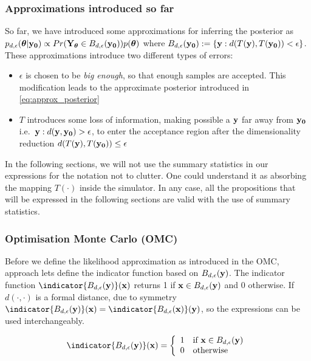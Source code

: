 \subsubsection{Approximations introduced so far}

So far, we have introduced some approximations for inferring the
posterior as
$p_{d,\epsilon}(\boldsymbol{\theta}|\mathbf{y_0}) \propto Pr(\mathbf{Y}_{\boldsymbol{\theta}} \in
B_{d,\epsilon}(\mathbf{y_0}))p(\boldsymbol{\theta})$ where
$B_{d,\epsilon}(\mathbf{y_0}) := \{\mathbf{y}: d(T(\mathbf{y}), T(\mathbf{y_0})) < \epsilon \}$. These
approximations introduce two different types of errors:

\begin{itemize}
\item $\epsilon$ is chosen to be \textit{big enough}, so that enough
  samples are accepted. This modification leads to the approximate
  posterior introduced in \eqref{eq:approx_posterior}
\item $T$ introduces some loss of information, making possible a $\mathbf{y}$
  far away from $\mathbf{y_0}$ i.e.\ $\mathbf{y}: d(\mathbf{y},\mathbf{y_0})>\epsilon$, to enter
  the acceptance region after the dimensionality reduction
  $d(T(\mathbf{y}), T(\mathbf{y_0})) \leq \epsilon$
\end{itemize}

\noindent
In the following sections, we will not use the summary statistics in
our expressions for the notation not to clutter. One could understand
it as absorbing the mapping $T(\cdot)$ inside the simulator. In any
case, all the propositions that will be expressed in the following
sections are valid with the use of summary statistics.
  
\subsubsection{Optimisation Monte Carlo (OMC)}

Before we define the likelihood approximation as introduced in the
OMC, approach lets define the indicator function based on
$B_{d,\epsilon}(\mathbf{y})$. The indicator function $\indicator{\region(\yb)}(\xb)$
returns 1 if $\mathbf{x} \in B_{d,\epsilon}(\mathbf{y})$ and 0 otherwise. If
$d(\cdot,\cdot)$ is a formal distance, due to symmetry
$\indicator{\region(\yb)}(\xb) = \indicator{\region(\xb)}(\yb)$, so
the expressions can be used interchangeably.

\begin{gather} \label{eq:indicator} \indicator{\region(\yb)}(\xb)=
  \left\{
    \begin{array}{ll}
      1 & \mbox{if } \xb \in \region(\yb) \\
      0 & \mbox{otherwise} 
    \end{array} \right. \end{gather}

